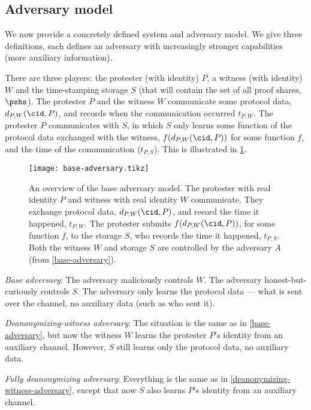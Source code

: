 \subsection{Adversary model}%
\label{formal-adversary-model}

We now provide a concretely defined system and adversary model.
We give three definitions, each defines an adversary with increasingly stronger 
capabilities (\ie more auxiliary information).

There are three players: the protester (with identity) \(P\), a witness (with 
identity) \(W\) and the time-stamping storage \(S\) (that will contain the set 
of all proof shares, \(\pshs\)).
The protester \(P\) and the witness \(W\) communicate some protocol data,
\(d_{P,W}(\cid, P)\), and records when the communication occurred \(t_{P,W}\).
The protester \(P\) communicates with \(S\), in which \(S\) only learns some 
function of the protocol data exchanged with the witness, \(f(d_{P,W}(\cid, 
  P))\) for some function \(f\), and the time of the communication 
(\(t_{P,S}\)).
This is illustrated in \cref{fig:base-adversary}.

\begin{figure}
  \centering
  \texttt{[image: base-adversary.tikz]}
  \caption{\label{fig:base-adversary}%
    An overview of the base adversary model.
    The protester with real identity \(P\) and witness with real identity \(W\) 
    communicate.
    They exchange protocol data, \(d_{P,W}(\cid, P)\), and record the time it 
    happened, \(t_{P,W}\).
    The protester submits \(f(d_{P,W}(\cid, P))\), for some function \(f\), to 
    the storage \(S\), who records the time it happened, \(t_{P,S}\).
    Both the witness \(W\) and storage \(S\) are controlled by the adversary 
    \(A\) (from \cref{base-adversary}).
  }
\end{figure}

\begin{adversaries}
\item\label{base-adversary}
  \emph{Base adversary}:
  The adversary maliciously controls \(W\).
  The adversary honest-but-curiously controls \(S\).
  The adversary only learns the protocol data --- \ie what is sent over the 
  channel, no auxiliary data (such as who sent it).

\item\label{deanonymizing-witness-adversary}
  \emph{Deanonymizing-witness adversary}:
  The situation is the same as in \cref{base-adversary}, but now the witness 
  \(W\) learns the protester \(P\)'s identity from an auxiliary channel.
  However, \(S\) still learns only the protocol data, no auxiliary data.

\item\label{deanonymizing-adversary}
  \emph{Fully deanonymizing adversary}:
  Everything is the same as in \cref{deanonymizing-witness-adversary}, except 
  that now \(S\) also learns \(P\)'s identity from an auxiliary channel.
\end{adversaries}

